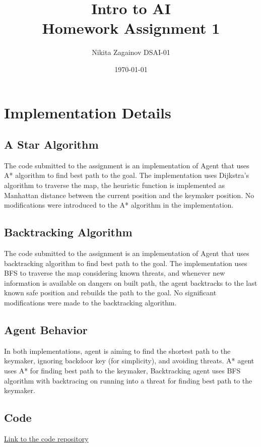 \documentclass[12pt]{article}
\title{Intro to AI \\ Homework Assignment 1}
\author{Nikita Zagainov DSAI-01}
\date{\today}
\begin{document}
\maketitle

\section{Implementation Details}
\subsection{A Star Algorithm}
The code submitted to the assignment is an implementation of Agent that uses A*
algorithm to find best path to the goal. The implementation uses Dijkstra's
algorithm to traverse the map, the heuristic function is implemented as
Manhattan distance between the current position and the keymaker position. No
modifications were introduced to the A* algorithm in the implementation.

\subsection{Backtracking Algorithm}
The code submitted to the assignment is an implementation of Agent that uses
backtracking algorithm to find best path to the goal. The implementation uses
BFS to traverse the map considering known threats, and whenever new information
is available on dangers on built path, the agent backtracks to the last known
safe position and rebuilds the path to the goal. No significant modifications
were made to the backtracking algorithm.

\subsection{Agent Behavior}
In both implementations, agent is aiming to find the shortest path to the
keymaker, ignoring backdoor key (for simplicity), and avoiding threats. A*
agent uses A* for finding best path to the keymaker, Backtracking agent uses
BFS algorithm with backtracing on running into a threat for finding best path
to the keymaker.

\subsection{Code}
\href{https://github.com/V1adych/itai_assignment_1}{Link to the code repository}
\end{document}
